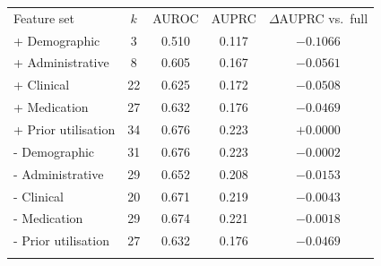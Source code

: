 \begin{tabular}{lcccc}
\hline\noalign{\smallskip}
Feature set & $k$ & AUROC & AUPRC & $\Delta$AUPRC vs.\ full \\
\noalign{\smallskip}\hline\noalign{\smallskip}
+ Demographic & 3 & 0.510 & 0.117 & $-0.1066$ \\
+ Administrative & 8 & 0.605 & 0.167 & $-0.0561$ \\
+ Clinical & 22 & 0.625 & 0.172 & $-0.0508$ \\
+ Medication & 27 & 0.632 & 0.176 & $-0.0469$ \\
+ Prior utilisation & 34 & 0.676 & 0.223 & $+0.0000$ \\
- Demographic & 31 & 0.676 & 0.223 & $-0.0002$ \\
- Administrative & 29 & 0.652 & 0.208 & $-0.0153$ \\
- Clinical & 20 & 0.671 & 0.219 & $-0.0043$ \\
- Medication & 29 & 0.674 & 0.221 & $-0.0018$ \\
- Prior utilisation & 27 & 0.632 & 0.176 & $-0.0469$ \\
\noalign{\smallskip}\hline
\end{tabular}
